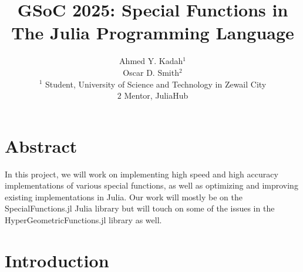 \documentclass{article}
\title{GSoC 2025: Special Functions in The Julia Programming Language}
\author{Ahmed Y. Kadah$^1$  
\\Oscar D. Smith$^2$ 
\\$^1$ Student, University of Science and Technology in Zewail City
\\ $2$ Mentor, JuliaHub}
\date{}
\theoremstyle{mytheoremstyle}
\theoremstyle{mytheoremstyle}
\theoremstyle{myproblemstyle}
\begin{document}
    \maketitle


  \section*{Abstract}
    In this project, we will work on implementing high speed and high accuracy implementations of various special functions, as well as optimizing and improving existing implementations in Julia.
    Our work will mostly be on the SpecialFunctions.jl Julia library but will touch on some of the issues in the HyperGeometricFunctions.jl library as well. 

  \section*{Introduction}
\end{document}

